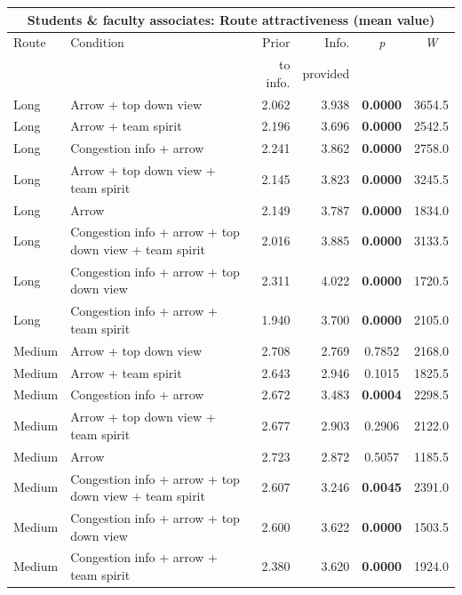 \begin{table}
\begin{scriptsize}

\begin{tabular}{llrrcc}
\multicolumn{6}{c}{ \textbf{Students \& faculty associates: Route attractiveness (mean value)}} \\
  \hline
 Route & Condition & Prior  & Info.  & \textit{p} & \textit{W} \\
   &  &  to info. & provided &  &  \\

  \hline
 Long & Arrow + top down view & 2.062 & 3.938 & \textbf{0.0000} & 3654.5 \\ 
   Long & Arrow + team spirit & 2.196 & 3.696 & \textbf{0.0000} & 2542.5 \\ 
   Long & Congestion info + arrow & 2.241 & 3.862 & \textbf{0.0000} & 2758.0 \\ 
   Long & Arrow + top down view + team spirit & 2.145 & 3.823 & \textbf{0.0000} & 3245.5 \\ 
   Long & Arrow & 2.149 & 3.787 & \textbf{0.0000} & 1834.0 \\ 
   Long & Congestion info + arrow + top down view + team spirit & 2.016 & 3.885 & \textbf{0.0000} & 3133.5 \\ 
   Long & Congestion info + arrow + top down view & 2.311 & 4.022 & \textbf{0.0000} & 1720.5 \\ 
   Long & Congestion info + arrow + team spirit & 1.940 & 3.700 & \textbf{0.0000} & 2105.0 \\ 
   \hline
   Medium & Arrow + top down view & 2.708 & 2.769 & 0.7852 & 2168.0 \\ 
   Medium & Arrow + team spirit & 2.643 & 2.946 & 0.1015 & 1825.5 \\ 
   Medium & Congestion info + arrow & 2.672 & 3.483 & \textbf{0.0004} & 2298.5 \\ 
   Medium & Arrow + top down view + team spirit & 2.677 & 2.903 & 0.2906 & 2122.0 \\ 
   Medium & Arrow & 2.723 & 2.872 & 0.5057 & 1185.5 \\ 
   Medium & Congestion info + arrow + top down view + team spirit & 2.607 & 3.246 & \textbf{0.0045} & 2391.0 \\ 
   Medium & Congestion info + arrow + top down view & 2.600 & 3.622 & \textbf{0.0000} & 1503.5 \\ 
   Medium & Congestion info + arrow + team spirit & 2.380 & 3.620 & \textbf{0.0000} & 1924.0 \\ 

\end{tabular}
\end{scriptsize}
\end{table}
